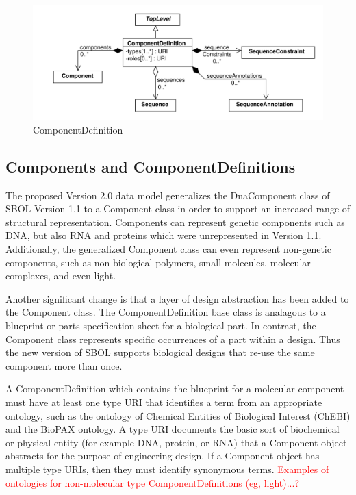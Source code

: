 \documentclass[draftspec]{sbmlpkgspec}
\begin{document}
\begin{figure}[h]
\begin{center}
\includegraphics[width=\textwidth]{uml/component_definition}
\caption[]{ComponentDefinition}
\label{uml:component_definition}
\end{center}
\end{figure}

\subsection{Components and ComponentDefinitions}

The proposed Version 2.0 data model generalizes the DnaComponent class of SBOL Version 1.1 to a Component class in order to support an increased range of structural representation. Components can represent genetic components such as DNA, but also RNA and proteins which were unrepresented in Version 1.1.  Additionally, the generalized Component class can even represent non-genetic components, such as non-biological polymers, small molecules, molecular complexes, and even light.

Another significant change is that a layer of design abstraction has been added to the Component class.  The ComponentDefinition base class is analagous to a blueprint or parts specification sheet for a biological part.  In contrast, the Component class represents specific occurrences of a part within a design.  Thus the new version of SBOL supports biological designs that re-use the same component more than once. 

A ComponentDefinition which contains the blueprint for a molecular component must have at least one type URI that identifies a term from an appropriate ontology, such as the ontology of Chemical Entities of Biological Interest (ChEBI) and the BioPAX ontology. A type URI documents the basic sort of biochemical or physical entity (for example DNA, protein, or RNA) that a Component object abstracts for the purpose of engineering design. If a Component object has multiple type URIs, then they must identify synonymous terms.
\textcolor{red}{Examples of ontologies for non-molecular type ComponentDefinitions (eg, light)...?}
\end{document}
